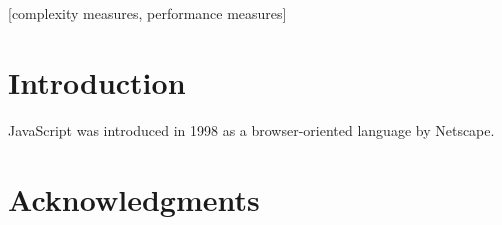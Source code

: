\documentclass{sig-alternate}
\begin{document}
\maketitle
\begin{abstract}After almost fifteen years, JavaScript has finally risen as a popular
language for implementing all kind of applications, from server-based
to rich Internet Applications. Its features are interesting for
implementing evolutionary algorithm frameworks 
that encompass both
tiers, but, besides, they allow a change in paradigm that goes beyond
the canonical evolutionary algorithm. 
In this paper we will experiment
with different architectures
implementations and evolutionary
algorithms to assess which ones offers most advantages in terms of
performance, scalability and ease of use 
for the computer scientist. All implementations  have been released as open source.
\end{abstract}

[complexity measures, performance measures]


\section{Introduction}

JavaScript was introduced in 1998 as a browser-oriented language by
Netscape. 


\section{Acknowledgments}


%

\end{document}
